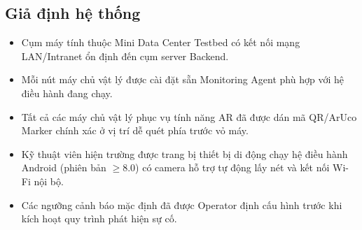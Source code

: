 \subsection{Giả định hệ thống}
\begin{itemize}
    \item Cụm máy tính thuộc Mini Data Center Testbed có kết nối mạng LAN/Intranet ổn định đến cụm server Backend.
    \item Mỗi nút máy chủ vật lý được cài đặt sẵn Monitoring Agent phù hợp với hệ điều hành đang chạy.
    \item Tất cả các máy chủ vật lý phục vụ tính năng AR đã được dán mã QR/ArUco Marker chính xác ở vị trí dễ quét phía trước vỏ máy.
    \item Kỹ thuật viên hiện trường được trang bị thiết bị di động chạy hệ điều hành Android (phiên bản $\ge 8.0$) có camera hỗ trợ tự động lấy nét và kết nối Wi-Fi nội bộ.
    \item Các ngưỡng cảnh báo mặc định đã được Operator định cấu hình trước khi kích hoạt quy trình phát hiện sự cố.
\end{itemize}

